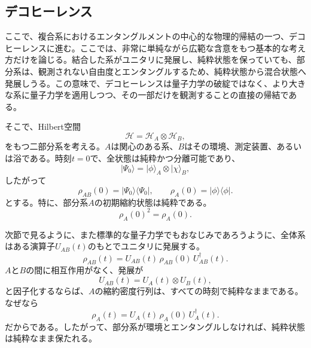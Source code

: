 \documentclass[a4paper,11pt,oneside]{article}
\theoremstyle{definition}
\numberwithin{equation}{section}
\begin{document}
\subsection{デコヒーレンス}



ここで、複合系におけるエンタングルメントの中心的な物理的帰結の一つ、デコヒーレンスに進む。ここでは、非常に単純ながら広範な含意をもつ基本的な考え方だけを論じる。結合した系がユニタリに発展し、純粋状態を保っていても、部分系は、観測されない自由度とエンタングルするため、純粋状態から混合状態へ発展しうる。この意味で、デコヒーレンスは量子力学の破綻ではなく、より大きな系に量子力学を適用しつつ、その一部だけを観測することの直接の帰結である。



そこで、Hilbert空間
\begin{equation}
\mathcal H = \mathcal H_A \otimes \mathcal H_B ,
\end{equation}
をもつ二部分系を考える。$A$は関心のある系、$B$はその環境、測定装置、あるいは浴である。時刻$t=0$で、全状態は純粋かつ分離可能であり、
\begin{equation}
|\Psi_0\rangle = |\phi\rangle_A \otimes |\chi\rangle_B ,
\end{equation}
したがって
\begin{equation}
\rho_{AB}(0) = |\Psi_0\rangle\langle\Psi_0| ,
\qquad
\rho_A(0) = |\phi\rangle\langle\phi| .
\end{equation}
とする。特に、部分系$A$の初期縮約状態は純粋である。
\begin{equation}
\rho_A(0)^2 = \rho_A(0) .
\end{equation}


次節で見るように、また標準的な量子力学でもおなじみであろうように、全体系はある演算子$U_{AB}(t)$のもとでユニタリに発展する。
\begin{equation}
\rho_{AB}(t)
=
U_{AB}(t)\,\rho_{AB}(0)\,U_{AB}^\dagger(t) .
\end{equation}
$A$と$B$の間に相互作用がなく、発展が
\begin{equation}
U_{AB}(t) = U_A(t)\otimes U_B(t) ,
\end{equation}
と因子化するならば、$A$の縮約密度行列は、すべての時刻で純粋なままである。なぜなら
\begin{equation}
\rho_A(t)
=
U_A(t)\,\rho_A(0)\,U_A^\dagger(t) .
\end{equation}
だからである。したがって、部分系が環境とエンタングルしなければ、純粋状態は純粋なまま保たれる。
\end{document}
